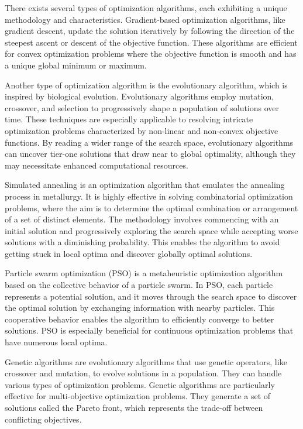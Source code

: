 There exists several types of optimization algorithms, each exhibiting a unique methodology and characteristics.   Gradient-based optimization algorithms, like gradient descent, update the solution iteratively by following the direction of the steepest ascent or descent of the objective function. These algorithms are efficient for convex optimization problems where the objective function is smooth and has a unique global minimum or maximum.

Another type of optimization algorithm is the evolutionary algorithm, which is inspired by biological evolution. Evolutionary algorithms employ mutation, crossover, and selection to progressively shape a population of solutions over time. These techniques are especially applicable to resolving intricate optimization problems characterized by non-linear and non-convex objective functions. By reading a wider range of the search space, evolutionary algorithms can uncover tier-one solutions that draw near to global optimality, although they may necessitate enhanced computational resources.

Simulated annealing is an optimization algorithm that emulates the annealing process in metallurgy. It is highly effective in solving combinatorial optimization problems, where the aim is to determine the optimal combination or arrangement of a set of distinct elements. The methodology involves commencing with an initial solution and progressively exploring the search space while accepting worse solutions with a diminishing probability. This enables the algorithm to avoid getting stuck in local optima and discover globally optimal solutions.

Particle swarm optimization (PSO) is a metaheuristic optimization algorithm based on the collective behavior of a particle swarm. In PSO, each particle represents a potential solution, and it moves through the search space to discover the optimal solution by exchanging information with nearby particles. This cooperative behavior enables the algorithm to efficiently converge to better solutions. PSO is especially beneficial for continuous optimization problems that have numerous local optima.

Genetic algorithms are evolutionary algorithms that use genetic operators, like crossover and mutation, to evolve solutions in a population. They can handle various types of optimization problems. Genetic algorithms are particularly effective for multi-objective optimization problems. They generate a set of solutions called the Pareto front, which represents the trade-off between conflicting objectives.

